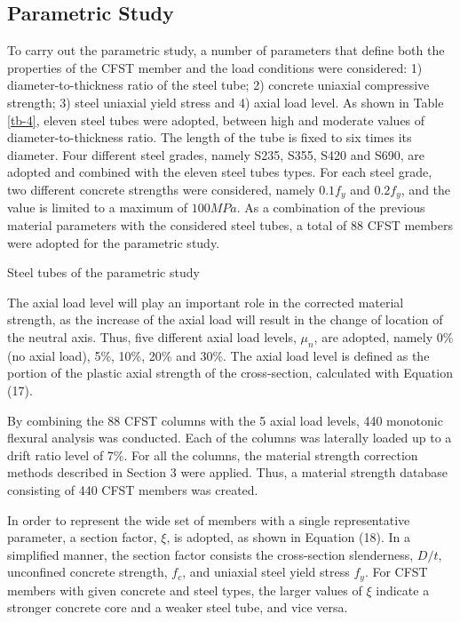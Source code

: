 \documentclass[12pt,a4]{article}
\begin{document}
	\subsection{Parametric Study}
	To carry out the parametric study, a number of parameters that define both the properties of the CFST member and the load conditions were considered: 1) diameter-to-thickness ratio of the steel tube; 2) concrete uniaxial compressive strength; 3) steel uniaxial yield stress and 4) axial load level. As shown in Table \ref{tb-4}, eleven steel tubes were adopted, between high and moderate values of diameter-to-thickness ratio. The length of the tube is fixed to six times its diameter. Four different steel grades, namely S235, S355, S420 and S690, are adopted and combined with the eleven steel tubes types. For each steel grade, two different concrete strengths were considered, namely $0.1f_y$ and $0.2f_y$, and the value is limited to a maximum of $100MPa$. As a combination of the previous material parameters with the considered steel tubes, a total of 88 CFST members were adopted for the parametric study.
	\par
	\begin{table}
		\caption{Steel tubes of the parametric study}
		\label{tb-4}
	\end{table}
	\par
	The axial load level will play an important role in the corrected material strength, as the increase of the axial load will result in the change of location of the neutral axis. Thus, five different axial load levels, $μ_n$, are adopted, namely 0\% (no axial load), 5\%, 10\%, 20\% and 30\%. The axial load level is defined as the portion of the plastic axial strength of the cross-section, calculated with Equation (17).
	\par
	By combining the 88 CFST columns with the 5 axial load levels, 440 monotonic flexural analysis was conducted. Each of the columns was laterally loaded up to a drift ratio level of 7\%. For all the columns, the material strength correction methods described in Section 3 were applied. Thus, a material strength database consisting of 440 CFST members was created.
	\par
	In order to represent the wide set of members with a single representative parameter, a section factor, $ξ$, is adopted, as shown in Equation (18). In a simplified manner, the section factor consists the cross-section slenderness, $D/t$, unconfined concrete strength, $f_c$, and uniaxial steel yield stress $f_y$. For CFST members with given concrete and steel types, the larger values of $ξ$ indicate a stronger concrete core and a weaker steel tube, and vice versa.
\end{document}
